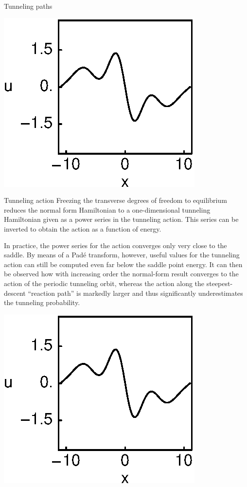 \documentclass{theo1poster}[2003/04/25]
\begin{document}
\begin{poster}{3}
\begin{sheet}{Tunneling paths}
\centerline{\includegraphics[width=.85\textwidth]{../../figs/1wKS22equil.eps}}
\end{sheet}



\begin{sheet}{Tunneling action}
Freezing the transverse degrees of freedom to equilibrium reduces the
normal form Hamiltonian to a one-dimensional tunneling Hamiltonian
given as a power series in the tunneling action. This series can be
inverted to obtain the action as a function of energy.

In practice, the power series for the action
converges only very close to the saddle. By means of a Pad\'e transform,
however, useful values for the tunneling action can still be computed
even far below the saddle point energy. It can then be observed how with
increasing order the normal-form result converges to the action of the
periodic tunneling orbit, whereas the action along the steepest-descent
``reaction path'' is markedly larger and thus significantly underestimates
the tunneling probability.

\centerline{\includegraphics[width=.96\textwidth]{../../figs/1wKS22equil.eps}}
\end{sheet}



\end{poster}
\end{document}
